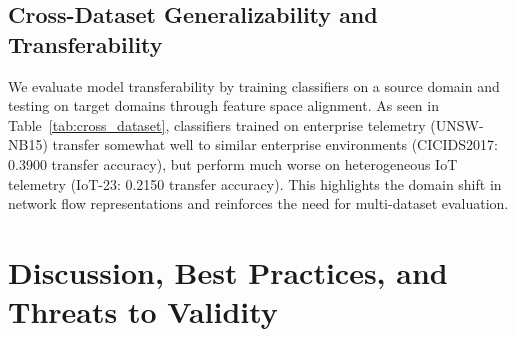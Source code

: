 \documentclass[conference]{IEEEtran}
\begin{document}
\subsection{Cross-Dataset Generalizability and Transferability}
We evaluate model transferability by training classifiers on a source domain and testing on target domains through feature space alignment. As seen in Table~\ref{tab:cross_dataset}, classifiers trained on enterprise telemetry (UNSW-NB15) transfer somewhat well to similar enterprise environments (CICIDS2017: 0.3900 transfer accuracy), but perform much worse on heterogeneous IoT telemetry (IoT-23: 0.2150 transfer accuracy). This highlights the domain shift in network flow representations and reinforces the need for multi-dataset evaluation.

\begin{table}[htbp]
\caption{Cross-Dataset Transfer Evaluation Accuracy}
\label{tab:cross_dataset}
\centering
{}
\end{table}

\section{Discussion, Best Practices, and Threats to Validity}
\label{sec:discussion}
\end{document}
